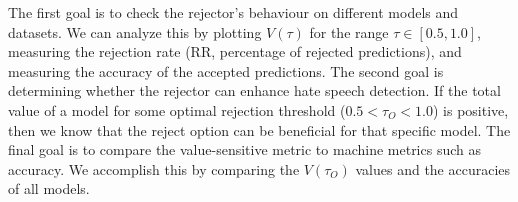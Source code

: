 %
The first goal is to check the rejector's behaviour on different models and datasets.
%
We can analyze this by plotting $V(\tau)$ for the range $\tau \in [0.5, 1.0]$, measuring the rejection rate (RR, percentage of rejected predictions), and measuring the accuracy of the accepted predictions.
%
The second goal is determining whether the rejector can enhance hate speech detection.
%
If the total value of a model for some optimal rejection threshold ($0.5 < \tau_O < 1.0$) is positive, then we know that the reject option can be beneficial for that specific model.
%
The final goal is to compare the value-sensitive metric to machine metrics such as accuracy.
%
We accomplish this by comparing the $V(\tau_O)$ values and the accuracies of all models.


